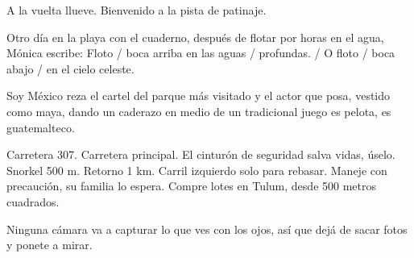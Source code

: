 \documentclass[11pt,twoside,openright,a6paper]{book}
\begin{document}
\vspace{0.5cm}
\hrulefill\hspace{0.2cm} \decofourleft\decofourright \hspace{0.2cm} \hrulefill
\vspace{0.5cm}

A la vuelta llueve. Bienvenido a la pista de patinaje.


\vspace{0.5cm}
\hrulefill\hspace{0.2cm} \decofourleft\decofourright \hspace{0.2cm} \hrulefill
\vspace{0.5cm}

 Otro día en la playa con el cuaderno, después de
flotar por horas en el agua, Mónica escribe: Floto / boca arriba en las
aguas / profundas. / O floto / boca abajo / en el cielo celeste.


\vspace{0.5cm}
\hrulefill\hspace{0.2cm} \decofourleft\decofourright \hspace{0.2cm} \hrulefill
\vspace{0.5cm}

Soy México reza el cartel del parque más visitado y el actor que posa,
vestido como maya, dando un caderazo en medio de un tradicional juego es
pelota, es guatemalteco.


\vspace{0.5cm}
\hrulefill\hspace{0.2cm} \decofourleft\decofourright \hspace{0.2cm} \hrulefill
\vspace{0.5cm}

Carretera 307. Carretera principal. El cinturón de seguridad salva
vidas, úselo. Snorkel 500  m. Retorno 1 km. Carril izquierdo solo para
rebasar. Maneje con precaución, su familia lo espera. Compre lotes en Tulum,
desde 500 metros cuadrados.


\vspace{0.5cm}
\hrulefill\hspace{0.2cm} \decofourleft\decofourright \hspace{0.2cm} \hrulefill
\vspace{0.5cm}

Ninguna cámara va a capturar lo que ves con los ojos, así que dejá de
sacar fotos y ponete a mirar.


\vspace{0.5cm}
\hrulefill\hspace{0.2cm} \decofourleft\decofourright \hspace{0.2cm} \hrulefill
\vspace{0.5cm}
\end{document}
